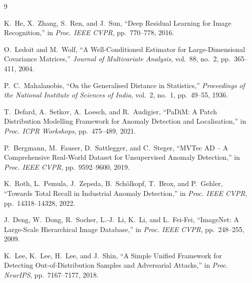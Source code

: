 \documentclass[conference]{IEEEtran}
\begin{document}
\begin{thebibliography}{9}

K.~He, X.~Zhang, S.~Ren, and J.~Sun,
``Deep Residual Learning for Image Recognition,''
in \textit{Proc. IEEE CVPR}, pp.~770--778, 2016.

O.~Ledoit and M.~Wolf,
``A Well-Conditioned Estimator for Large-Dimensional Covariance Matrices,''
\textit{Journal of Multivariate Analysis}, vol.~88, no.~2, pp.~365--411, 2004.

P.~C.~Mahalanobis,
``On the Generalised Distance in Statistics,''
\textit{Proceedings of the National Institute of Sciences of India},
vol.~2, no.~1, pp.~49--55, 1936.

T.~Defard, A.~Setkov, A.~Loesch, and R.~Audigier,
``PaDiM: A Patch Distribution Modelling Framework for Anomaly Detection and
Localisation,''
in \textit{Proc. ICPR Workshops}, pp.~475--489, 2021.

P.~Bergmann, M.~Fauser, D.~Sattlegger, and C.~Steger,
``MVTec AD -- A Comprehensive Real-World Dataset for Unsupervised Anomaly
Detection,''
in \textit{Proc. IEEE CVPR}, pp.~9592--9600, 2019.

K.~Roth, L.~Pemula, J.~Zepeda, B.~Schölkopf, T.~Brox, and P.~Gehler,
``Towards Total Recall in Industrial Anomaly Detection,''
in \textit{Proc. IEEE CVPR}, pp.~14318--14328, 2022.

J.~Deng, W.~Dong, R.~Socher, L.-J.~Li, K.~Li, and L.~Fei-Fei,
``ImageNet: A Large-Scale Hierarchical Image Database,''
in \textit{Proc. IEEE CVPR}, pp.~248--255, 2009.

K.~Lee, K.~Lee, H.~Lee, and J.~Shin,
``A Simple Unified Framework for Detecting Out-of-Distribution Samples and
Adversarial Attacks,''
in \textit{Proc. NeurIPS}, pp.~7167--7177, 2018.

\end{thebibliography}


\end{document}

